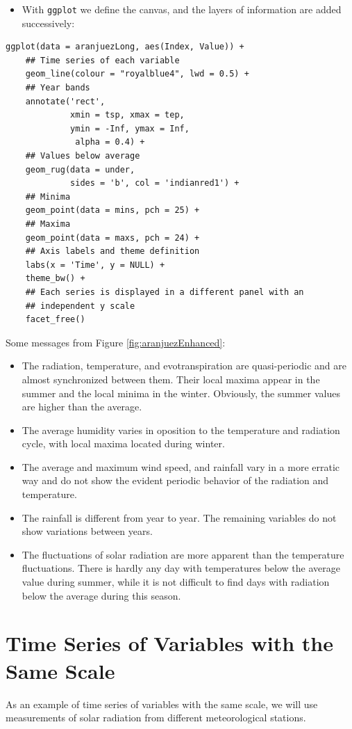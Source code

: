\begin{itemize}
\item With \texttt{ggplot} we define the canvas, and the layers of information are
added successively:
\end{itemize}
\lstset{language=r,label= ,caption= ,captionpos=b,numbers=none}
\begin{lstlisting}
ggplot(data = aranjuezLong, aes(Index, Value)) +
    ## Time series of each variable
    geom_line(colour = "royalblue4", lwd = 0.5) +
    ## Year bands
    annotate('rect',
             xmin = tsp, xmax = tep,
             ymin = -Inf, ymax = Inf,
              alpha = 0.4) + 
    ## Values below average
    geom_rug(data = under,
             sides = 'b', col = 'indianred1') +
    ## Minima
    geom_point(data = mins, pch = 25) +
    ## Maxima
    geom_point(data = maxs, pch = 24) +
    ## Axis labels and theme definition
    labs(x = 'Time', y = NULL) +
    theme_bw() +
    ## Each series is displayed in a different panel with an
    ## independent y scale
    facet_free()
\end{lstlisting}

Some messages from Figure \ref{fig:aranjuezEnhanced}:
\begin{itemize}
\item The radiation, temperature, and evotranspiration are
quasi-periodic and are almost synchronized between them. Their
local maxima appear in the summer and the local minima in the
winter. Obviously, the summer values are higher than the
average.
\item The average humidity varies in oposition to the temperature and
radiation cycle, with local maxima located during winter.
\item The average and maximum wind speed, and rainfall vary in a more
erratic way and do not show the evident periodic behavior of
the radiation and temperature.
\item The rainfall is different from year to year. The remaining variables
do not show variations between years.
\item The fluctuations of solar radiation are more apparent than
the temperature fluctuations. There is hardly any day with
temperatures below the average value during summer, while it is
not difficult to find days with radiation below the average
during this season.
\end{itemize}

\section{Time Series of Variables with the Same Scale \label{SEC:sameScale}}
\label{sec:org1a2eaa0}
As an example of time series of variables with the same scale, we will
use measurements of solar radiation from different meteorological
stations.

